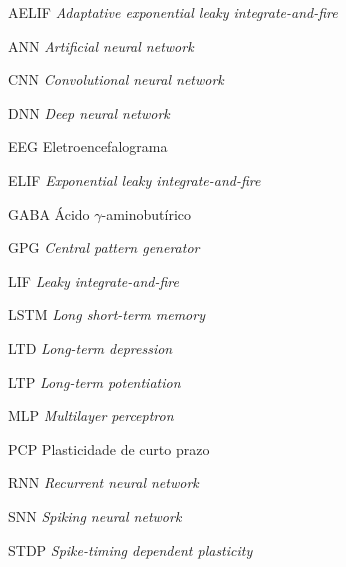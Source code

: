 \documentclass[
	12pt,				%
	openright,			%
	oneside,			%
	a4paper,			%
	chapter=TITLE,		%
	english,			%
	french,				%
	spanish,			%
	brazil				%
	]{abntex2}
\theoremstyle{definition}
\begin{document}
\begin{siglas}
	\item[AELIF] \textit{Adaptative exponential leaky integrate-and-fire}
	\item[ANN] \textit{Artificial neural network}
	\item[CNN] \textit{Convolutional neural network}
	\item[DNN] \textit{Deep neural network}
	\item[EEG] Eletroencefalograma
	\item[ELIF] \textit{Exponential leaky integrate-and-fire}
	\item[GABA] Ácido $\gamma$-aminobutírico
	\item[GPG] \textit{Central pattern generator}
	\item[LIF] \textit{Leaky integrate-and-fire}
	\item[LSTM] \textit{Long short-term memory}
	\item[LTD] \textit{Long-term depression}
	\item[LTP] \textit{Long-term potentiation}
	\item[MLP] \textit{Multilayer perceptron}
	\item[PCP] Plasticidade de curto prazo
	\item[RNN] \textit{Recurrent neural network}
	\item[SNN] \textit{Spiking neural network}
	\item[STDP] \textit{Spike-timing dependent plasticity}
\end{siglas}
\end{document}
